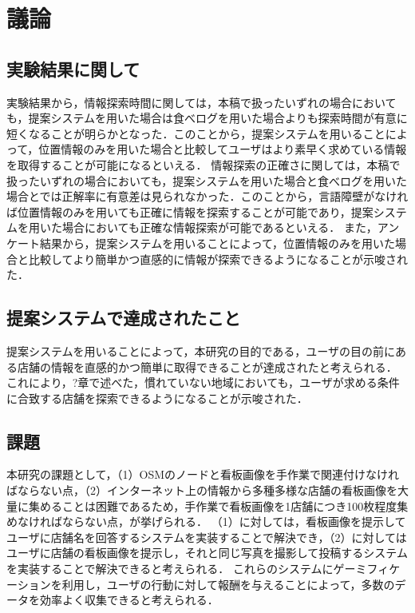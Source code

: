 \section{議論}
\subsection{実験結果に関して}
  実験結果から，情報探索時間に関しては，本稿で扱ったいずれの場合においても，提案システムを用いた場合は食べログを用いた場合よりも探索時間が有意に短くなることが明らかとなった．このことから，提案システムを用いることによって，位置情報のみを用いた場合と比較してユーザはより素早く求めている情報を取得することが可能になるといえる．
  情報探索の正確さに関しては，本稿で扱ったいずれの場合においても，提案システムを用いた場合と食べログを用いた場合とでは正解率に有意差は見られなかった．このことから，言語障壁がなければ位置情報のみを用いても正確に情報を探索することが可能であり，提案システムを用いた場合においても正確な情報探索が可能であるといえる．
  また，アンケート結果から，提案システムを用いることによって，位置情報のみを用いた場合と比較してより簡単かつ直感的に情報が探索できるようになることが示唆された．

\subsection{提案システムで達成されたこと}
  提案システムを用いることによって，本研究の目的である，ユーザの目の前にある店舗の情報を直感的かつ簡単に取得できることが達成されたと考えられる．
  これにより，?章で述べた，慣れていない地域においても，ユーザが求める条件に合致する店舗を探索できるようになることが示唆された．

\subsection{課題}
\label{subsection:sbs_limitation}
  本研究の課題として，（1）OSMのノードと看板画像を手作業で関連付けなければならない点，（2）インターネット上の情報から多種多様な店舗の看板画像を大量に集めることは困難であるため，手作業で看板画像を1店舗につき100枚程度集めなければならない点，が挙げられる．
  （1）に対しては，看板画像を提示してユーザに店舗名を回答するシステムを実装することで解決でき，（2）に対してはユーザに店舗の看板画像を提示し，それと同じ写真を撮影して投稿するシステムを実装することで解決できると考えられる．
  これらのシステムにゲーミフィケーションを利用し，ユーザの行動に対して報酬を与えることによって，多数のデータを効率よく収集できると考えられる．

